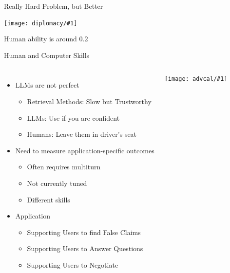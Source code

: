 \documentclass[compress]{beamer}
\newcommand{\abr}[1]{\textsc{#1} }
\newcommand{\gfxd}[2]{
	\begin{center}
		\texttt{[image: diplomacy/\#1]}
	\end{center}
}
\newcommand{\gfxa}[2]{
	\begin{center}
		\texttt{[image: advcal/\#1]}
	\end{center}
}
\newif\iflong\longfalse
\newif\ifdiplomacy\diplomacytrue
\begin{document}
\begin{frame}{Really Hard Problem, but Better}
	\gfxd{pholus_deception_detection}{.7}
	
	Human ability is around 0.2
\end{frame}
\fi 


\iflong
\begin{frame}{Recap}
	\begin{itemize}
		\item Reinforcement learning is really good at determining moves
		\item Language and cooperation lags behind
		\item Diplomacy remains a useful language game
		\begin{itemize}
			\item Not just for winning the game
			\item Are you respected
			\item Are you truthful
			\item Are you helpful
		\end{itemize}
		\item Maybe we can do this on a small scale so that it applies to all \abr{ai}
	\end{itemize}
	
\end{frame}
\fi

\begin{frame}{Human and Computer Skills}
	\begin{columns}
		
		\begin{itemize}
			\item LLMs are not perfect
			\begin{itemize}
				\item Retrieval Methods: Slow but Trustworthy
				\item LLMs: Use if you are confident
				\item Humans: Leave them in driver's seat
			\end{itemize}
			\item Need to measure application-specific outcomes
			\begin{itemize}
				\item Often requires multiturn
				\item Not currently tuned
				\item Different skills
			\end{itemize}
			\item Application
			\begin{itemize}
				\item Supporting Users to find False Claims
				\item Supporting Users to Answer Questions
				\ifdiplomacy
				\item Supporting Users to Negotiate
				\fi
			\end{itemize}
		\end{itemize}
		
		\gfxa{ken_vs_hal}{1}
	\end{columns}
\end{frame}
\end{document}
